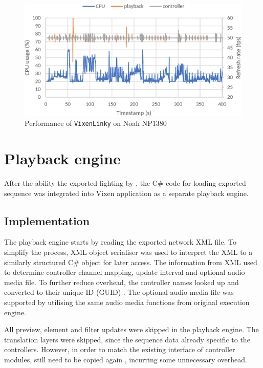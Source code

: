 \begin{figure}[!t]
  \centering
  \includegraphics[width=0.8\columnwidth]{Figs/vixenlinky_noah.eps}
  \caption{\footnotesize Performance of \texttt{VixenLinky} on Noah NP1380}
  \label{fig:vixenlinky_noah}
\end{figure}

\section{Playback engine}

After  the ability  the exported lighting  by  , the C\# code for loading exported sequence  was integrated into  Vixen application as a separate playback engine.

\subsection{Implementation}

The playback engine starts by reading the exported network XML file. To simplify the process,  XML object serialiser was used to interpret  the XML  to a similarly structured C\# object for later access. The information  from XML  used to determine controller channel mapping, update interval and optional audio media file. To further reduce  overhead, the controller names  looked up and converted to their unique ID (GUID) . The optional audio media file was supported by utilising the same audio media functions from  original execution engine.

All preview, element and filter updates were skipped in the playback engine. The translation layers were skipped, since the sequence data  already specific to the controllers. However, in order to match the existing interface of controller modules,  still need to be copied again , incurring some unnecessary overhead.

